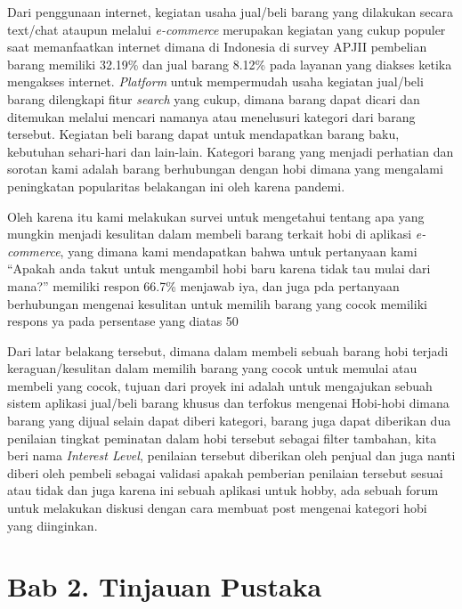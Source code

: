 \documentclass[a4paper]{article}
\begin{document}
Dari penggunaan internet, kegiatan usaha jual/beli barang yang dilakukan secara text/chat ataupun melalui \textit{e-commerce} merupakan kegiatan yang cukup populer saat memanfaatkan internet dimana di Indonesia di survey APJII pembelian barang memiliki 32.19\% dan jual barang 8.12\% pada layanan yang diakses ketika mengakses internet\autocite{indonesia2017infografis}. \textit{Platform} untuk mempermudah usaha kegiatan jual/beli barang dilengkapi fitur \textit{search} yang cukup, dimana barang dapat dicari dan ditemukan melalui mencari namanya atau menelusuri kategori dari barang tersebut. Kegiatan beli barang dapat untuk mendapatkan barang baku, kebutuhan sehari-hari dan lain-lain. Kategori barang yang menjadi perhatian dan sorotan kami adalah barang berhubungan dengan hobi dimana yang mengalami peningkatan popularitas belakangan ini oleh karena pandemi\autocite{langstedt2022loneliness}.


Oleh karena itu kami melakukan survei untuk mengetahui tentang apa yang mungkin menjadi kesulitan dalam membeli barang terkait hobi di aplikasi \textit{e-commerce}, yang dimana kami mendapatkan bahwa untuk pertanyaan kami “Apakah anda takut untuk mengambil hobi baru karena tidak tau mulai dari mana?” memiliki respon 66.7\% menjawab iya, dan juga pda pertanyaan berhubungan mengenai kesulitan untuk memilih barang yang cocok memiliki respons ya pada persentase yang diatas 50%


Dari latar belakang tersebut, dimana dalam membeli sebuah barang hobi terjadi keraguan/kesulitan dalam memilih barang yang cocok untuk memulai atau membeli yang cocok, tujuan dari proyek ini adalah untuk mengajukan sebuah sistem aplikasi jual/beli barang khusus dan terfokus mengenai Hobi-hobi dimana barang yang dijual selain dapat diberi kategori, barang juga dapat diberikan dua penilaian tingkat peminatan dalam hobi tersebut sebagai filter tambahan, kita beri nama \textit{Interest Level}, penilaian tersebut diberikan oleh penjual dan juga nanti diberi oleh pembeli sebagai validasi apakah pemberian penilaian tersebut sesuai atau tidak dan juga karena ini sebuah aplikasi untuk hobby, ada sebuah forum untuk melakukan diskusi dengan cara membuat post mengenai kategori hobi yang diinginkan.

\newpage
\section*{Bab 2. Tinjauan Pustaka}
\end{document}
